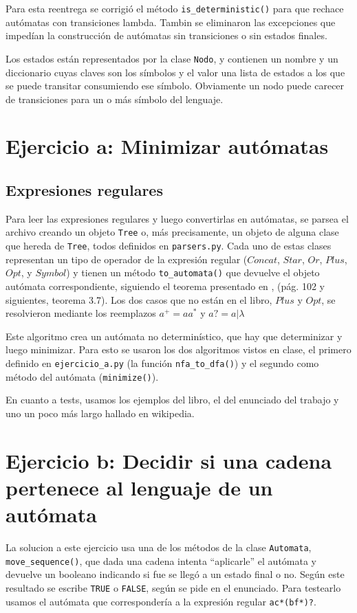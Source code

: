 \documentclass{article}
\begin{document}
Para esta reentrega se corrigió el m\'etodo \texttt{is\_deterministic()} para que rechace autómatas
con transiciones lambda.  Tambin se eliminaron las excepciones que impedían la construcción de
autómatas sin transiciones o sin estados finales.

Los estados están representados por la clase \texttt{Nodo}, y contienen un nombre y un diccionario
cuyas claves son los símbolos y el valor una lista de estados a los que se puede transitar
consumiendo ese símbolo.  Obviamente un nodo puede carecer de transiciones para un o más símbolo del
lenguaje.

\section*{Ejercicio a: Minimizar autómatas}
\subsection*{Expresiones regulares}

Para leer las expresiones regulares y luego convertirlas en autómatas, se parsea el
archivo creando un objeto \texttt{Tree} o, más precisamente, un objeto de alguna clase que hereda de
\texttt{Tree}, todos definidos en \texttt{parsers.py}.  Cada uno de estas clases representan un tipo
de operador de la expresión regular ($Concat$, $Star$, $Or$, $Plus$, $Opt$, y $Symbol$) y tienen un
m\'etodo \texttt{to\_automata()} que devuelve el objeto autómata correspondiente, siguiendo el
teorema presentado en \Hopcroft, (pág. 102 y siguientes, teorema 3.7).  Los dos casos que no están
en el libro, $Plus$ y $Opt$, se resolvieron mediante los reemplazos $a^{+} = aa^{*}$ y $a? = a|\lambda$

Este algoritmo crea un autómata no determinístico, que hay que determinizar y luego minimizar.  Para
esto se usaron los dos algoritmos vistos en clase, el primero definido en \texttt{ejercicio\_a.py}
(la función \texttt{nfa\_to\_dfa()}) y el segundo como m\'etodo del autómata (\texttt{minimize()}).

En cuanto a tests, usamos los ejemplos del libro, el del enunciado del trabajo y uno un poco más
largo hallado en wikipedia.

\section*{Ejercicio b: Decidir si una cadena pertenece al lenguaje de un autómata}
La solucion a este ejercicio usa una de los métodos de la clase \texttt{Automata},
\texttt{move\_sequence()}, que dada una cadena intenta ``aplicarle'' el autómata y devuelve un
booleano indicando si fue se llegó a un estado final o no.  Según este resultado se escribe
\texttt{TRUE} o \texttt{FALSE}, según se pide en el enunciado.  Para testearlo usamos el autómata
que correspondería a la expresión regular \texttt{ac*(bf*)?}.
\end{document}
